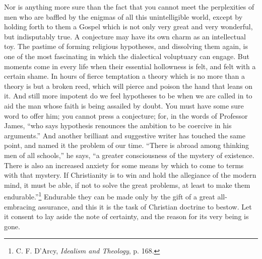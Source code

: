 \documentclass[12pt,a5paper]{article}
\begin{document}
Nor is anything more sure than the fact that you cannot
meet the perplexities of men who are baffled by the enigmas
of all this unintelligible world, except by holding forth to
them a Gospel which is not only very great and very wonderful,
but indisputably true. A conjecture may have its
own charm as an intellectual toy. The pastime of forming
religious hypotheses, and dissolving them again, is one of
the most fascinating in which the dialectical voluptuary can
engage. But moments come in every life when their essential
hollowness is felt, and felt with a certain shame. In
hours of fierce temptation a theory which is no more than
a theory is but a broken reed, which will pierce and poison
the hand that leans on it. And still more impotent do we
feel hypotheses to be when we are called in to aid the man
whose faith is being assailed by doubt. You must have
some sure word to offer him; you cannot press a conjecture;
for, in the words of Professor James, ``who says hypothesis
renounces the ambition to be coercive in his arguments.''
And another brilliant and suggestive writer has touched the
same point, and named it the problem of our time. ``There
is abroad among thinking men of all schools,'' he says,
``a greater consciousness of the mystery of existence.
There is also an increased anxiety for some means by which
to come to terms with that mystery. If Christianity is to
win and hold the allegiance of the modern mind, it must be
able, if not to solve the great problems, at least to make
them endurable.''\footnote{
C. F. D'Arcy, \textit{Idealism and Theology}, p. 168.
} 
Endurable they can be made only by
the gift of a great all-embracing assurance, and this it is
the task of Christian doctrine to bestow. Let it consent to
lay aside the note of certainty, and the reason for its very
being is gone.
\end{document}
